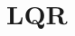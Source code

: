 \documentclass[12pt]{book}
\begin{document}

% 



% 

\chapter{LQR}
\label{chapter:LQR}
%


% 

% 


% 


%

%
%
\end{document}
